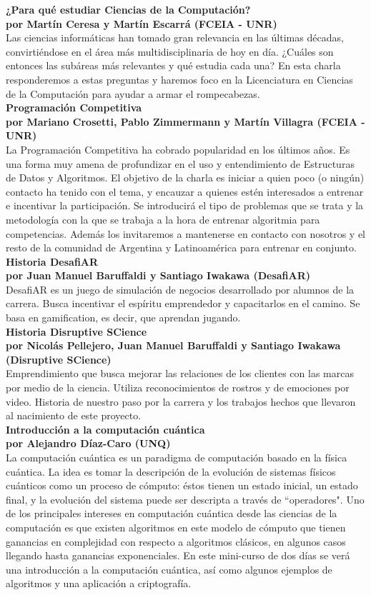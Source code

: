 \documentclass[12pt, a4paper]{article}
\newcommand{\charla}[3]{
	{\large\bf#1}\\
	{\bf por #2}\\
	#3\\
}
\begin{document}
\charla
{¿Para qué estudiar Ciencias de la Computación?}
{Martín Ceresa y Martín Escarrá (FCEIA - UNR)}
{Las ciencias informáticas han tomado gran relevancia en las últimas décadas,
convirtiéndose en el área más multidisciplinaria de hoy en día. ¿Cuáles son
entonces las subáreas más relevantes y qué estudia cada una? En esta charla
responderemos a estas preguntas y haremos foco en la Licenciatura en Ciencias
de la Computación para ayudar a armar el rompecabezas.}

\charla
{Programación Competitiva}
{Mariano Crosetti, Pablo Zimmermann y Martín Villagra (FCEIA - UNR)}
{La Programación Competitiva ha cobrado popularidad en los últimos años. Es una forma muy amena de profundizar en el uso y entendimiento de Estructuras de Datos y Algoritmos. El objetivo de la charla es iniciar a quien poco (o ningún) contacto ha tenido con el tema, y encauzar a quienes estén interesados a entrenar e incentivar la participación. Se introducirá el tipo de problemas que se trata y la metodología con la que se trabaja a la hora de entrenar algoritmia para competencias. Además los invitaremos a mantenerse en contacto con nosotros y el resto de la comunidad de Argentina y Latinoamérica para entrenar en conjunto.}

\charla
{Historia DesafiAR}
{Juan Manuel Baruffaldi y Santiago Iwakawa (DesafiAR)}
{DesafiAR es un juego de simulación de negocios desarrollado por alumnos de la carrera. Busca incentivar el espíritu emprendedor y capacitarlos en el camino. Se basa en gamification, es decir, que aprendan jugando.}

\charla
{Historia Disruptive SCience}
{Nicolás Pellejero, Juan Manuel Baruffaldi y Santiago Iwakawa (Disruptive SCience)}
{Emprendimiento que busca mejorar las relaciones de los clientes con las marcas por medio de la ciencia. Utiliza reconocimientos de rostros y de emociones por video. Historia de nuestro paso por la carrera y los trabajos hechos que llevaron al nacimiento de este proyecto.}

\charla
{Introducción a la computación cuántica}
{Alejandro Díaz-Caro (UNQ)}
{La computación cuántica es un paradigma de computación basado en la física cuántica. La idea es tomar la descripción de la evolución de sistemas físicos cuánticos como un proceso de cómputo: éstos tienen un estado inicial, un estado final, y la evolución del sistema puede ser descripta a través de ``operadores". Uno de los principales intereses en computación cuántica desde las ciencias de la computación es que existen algoritmos en este modelo de cómputo que tienen ganancias en complejidad con respecto a algoritmos clásicos, en algunos casos llegando hasta ganancias exponenciales. En este mini-curso de dos días se verá una introducción a la computación cuántica, así como algunos ejemplos de algoritmos y una aplicación a criptografía.}
\end{document}
